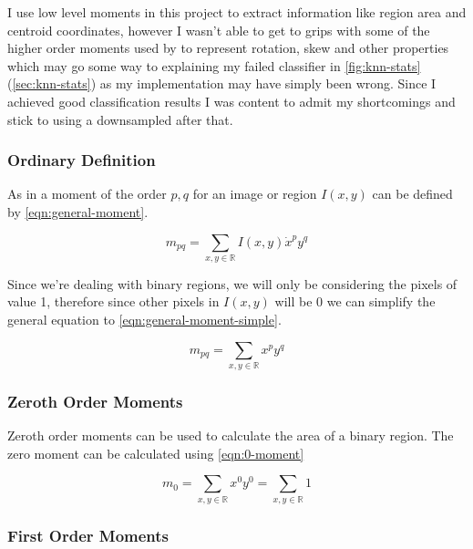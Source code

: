 I use low level moments in this project to extract information like region area and centroid coordinates, however I wasn't able to get to grips with some of the higher order moments used by \cite{fujinaga1996adaptive,arabelo} to represent rotation, skew and other properties which may go some way to explaining my failed classifier in \cref{fig:knn-stats} (\cref{sec:knn-stats}) as my implementation may have simply been wrong. Since I achieved good classification results I was content to admit my shortcomings and stick to using a downsampled after that.

\subsubsection{Ordinary Definition}

As in \cite{burger2009principles} a moment of the order $p, q$ for an image or region $I(x,y)$ can be defined by \cref{eqn:general-moment}.

\begin{equation}\label{eqn:general-moment}
  m_{pq} = \sum_{x, y \in \mathbb{R}} I(x,y) \dot x^p y^q
\end{equation}

Since we're dealing with binary regions, we will only be considering the pixels of value 1, therefore since other pixels in $I(x,y)$ will be 0 we can simplify the general equation to \cref{eqn:general-moment-simple}.

\begin{equation}\label{eqn:general-moment-simple}
  m_{pq} = \sum_{x, y \in \mathbb{R}} x^p y^q
\end{equation}

\subsubsection{Zeroth Order Moments}

Zeroth order moments can be used to calculate the area of a binary region. The zero moment can be calculated using \cref{eqn:0-moment}

\begin{equation}\label{eqn:0-moment}
  m_{0} = \sum_{x, y \in \mathbb{R}} x^0 y^0 = \sum_{x, y \in \mathbb{R}} 1
\end{equation}

\subsubsection{First Order Moments}

